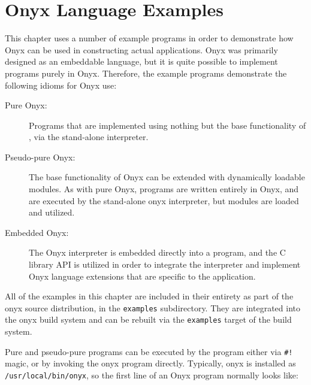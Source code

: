 %
%
%
%
%

\clearemptydoublepage
\chapter{Onyx Language Examples}
\label{onyxex}

This chapter uses a number of example programs in order to demonstrate how Onyx
can be used in constructing actual applications.  Onyx was primarily designed as
an embeddable language, but it is quite possible to implement programs purely in
Onyx.  Therefore, the example programs demonstrate the following idioms for Onyx
use:

\begin{description}
\item[Pure Onyx: ] Programs that are implemented using nothing but the base
  functionality of , via the stand-alone
   interpreter.
\item[Pseudo-pure Onyx: ] The base functionality of Onyx can be extended with
  dynamically loadable modules.  As with pure Onyx, programs are written
  entirely in Onyx, and are executed by the stand-alone onyx interpreter, but
  modules are loaded and utilized.
\item[Embedded Onyx: ] The Onyx interpreter is embedded directly into a program,
  and the  C library API is utilized in order to
  integrate the interpreter and implement Onyx language extensions that are
  specific to the application.
\end{description}

All of the examples in this chapter are included in their entirety as part of
the onyx source distribution, in the {\tt examples} subdirectory.  They are
integrated into the onyx build system and can be rebuilt via the {\tt examples}
target of the build system.

Pure and pseudo-pure programs can be executed by the 
program either via {\tt \#!} magic, or by invoking the onyx program directly.
Typically, onyx is installed as {\tt /usr/local/bin/onyx}, so the first line of
an Onyx program normally looks like:

